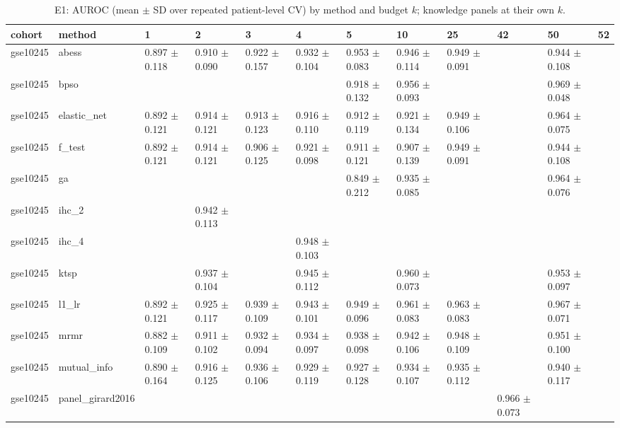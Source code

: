 \begin{table}[t]
  \centering
  \caption{E1: AUROC (mean $\pm$ SD over repeated patient-level CV) by method and budget $k$; knowledge panels at their own $k$.}
  \label{tab:e1_auroc}
  \small
  \begin{tabular}{llllllllllll}
    \toprule
    cohort & method & 1 & 2 & 3 & 4 & 5 & 10 & 25 & 42 & 50 & 52 \\
    \midrule
    gse10245 & abess & 0.897 $\pm$ 0.118 & 0.910 $\pm$ 0.090 & 0.922 $\pm$ 0.157 & 0.932 $\pm$ 0.104 & 0.953 $\pm$ 0.083 & 0.946 $\pm$ 0.114 & 0.949 $\pm$ 0.091 &  & 0.944 $\pm$ 0.108 &  \\
    gse10245 & bpso &  &  &  &  & 0.918 $\pm$ 0.132 & 0.956 $\pm$ 0.093 &  &  & 0.969 $\pm$ 0.048 &  \\
    gse10245 & elastic\_net & 0.892 $\pm$ 0.121 & 0.914 $\pm$ 0.121 & 0.913 $\pm$ 0.123 & 0.916 $\pm$ 0.110 & 0.912 $\pm$ 0.119 & 0.921 $\pm$ 0.134 & 0.949 $\pm$ 0.106 &  & 0.964 $\pm$ 0.075 &  \\
    gse10245 & f\_test & 0.892 $\pm$ 0.121 & 0.914 $\pm$ 0.121 & 0.906 $\pm$ 0.125 & 0.921 $\pm$ 0.098 & 0.911 $\pm$ 0.121 & 0.907 $\pm$ 0.139 & 0.949 $\pm$ 0.091 &  & 0.944 $\pm$ 0.108 &  \\
    gse10245 & ga &  &  &  &  & 0.849 $\pm$ 0.212 & 0.935 $\pm$ 0.085 &  &  & 0.964 $\pm$ 0.076 &  \\
    gse10245 & ihc\_2 &  & 0.942 $\pm$ 0.113 &  &  &  &  &  &  &  &  \\
    gse10245 & ihc\_4 &  &  &  & 0.948 $\pm$ 0.103 &  &  &  &  &  &  \\
    gse10245 & ktsp &  & 0.937 $\pm$ 0.104 &  & 0.945 $\pm$ 0.112 &  & 0.960 $\pm$ 0.073 &  &  & 0.953 $\pm$ 0.097 &  \\
    gse10245 & l1\_lr & 0.892 $\pm$ 0.121 & 0.925 $\pm$ 0.117 & 0.939 $\pm$ 0.109 & 0.943 $\pm$ 0.101 & 0.949 $\pm$ 0.096 & 0.961 $\pm$ 0.083 & 0.963 $\pm$ 0.083 &  & 0.967 $\pm$ 0.071 &  \\
    gse10245 & mrmr & 0.882 $\pm$ 0.109 & 0.911 $\pm$ 0.102 & 0.932 $\pm$ 0.094 & 0.934 $\pm$ 0.097 & 0.938 $\pm$ 0.098 & 0.942 $\pm$ 0.106 & 0.948 $\pm$ 0.109 &  & 0.951 $\pm$ 0.100 &  \\
    gse10245 & mutual\_info & 0.890 $\pm$ 0.164 & 0.916 $\pm$ 0.125 & 0.936 $\pm$ 0.106 & 0.929 $\pm$ 0.119 & 0.927 $\pm$ 0.128 & 0.934 $\pm$ 0.107 & 0.935 $\pm$ 0.112 &  & 0.940 $\pm$ 0.117 &  \\
    gse10245 & panel\_girard2016 &  &  &  &  &  &  &  & 0.966 $\pm$ 0.073 &  &  \\

\end{tabular}
\end{table}
